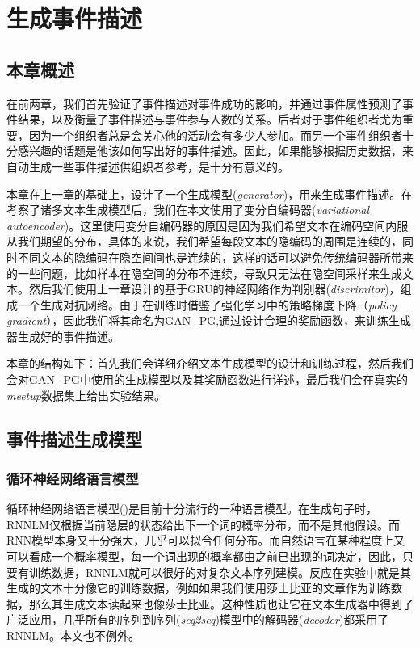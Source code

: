 \documentclass[]{template}
\begin{document}
\section{生成事件描述}

\subsection{本章概述}
在前两章，我们首先验证了事件描述对事件成功的影响，并通过事件属性预测了事件结果，以及衡量了事件描述与事件参与人数的关系。后者对于事件组织者尤为重要，因为一个组织者总是会关心他的活动会有多少人参加。而另一个事件组织者十分感兴趣的话题是他该如何写出好的事件描述。因此，如果能够根据历史数据，来自动生成一些事件描述供组织者参考，是十分有意义的。

本章在上一章的基础上，设计了一个生成模型(\textit{generator})，用来生成事件描述。在考察了诸多文本生成模型后，我们在本文使用了变分自编码器\cite{kingma_auto-encoding_2013,bowman_generating_2015}(\textit{variational autoencoder})。这里使用变分自编码器的原因是因为我们希望文本在编码空间内服从我们期望的分布，具体的来说，我们希望每段文本的隐编码的周围是连续的，同时不同文本的隐编码在隐空间间也是连续的，这样的话可以避免传统编码器所带来的一些问题，比如样本在隐空间的分布不连续，导致只无法在隐空间采样来生成文本。然后我们使用上一章设计的基于GRU的神经网络作为判别器(\textit{discrimitor})，组成一个生成对抗网络\cite{goodfellow_generative_2014}。由于在训练时借鉴了强化学习中的策略梯度下降（\textit{policy gradient}），因此我们将其命名为GAN\_PG,通过设计合理的奖励函数，来训练生成器生成好的事件描述。

本章的结构如下：首先我们会详细介绍文本生成模型的设计和训练过程，然后我们会对GAN\_PG中使用的生成模型以及其奖励函数进行详述，最后我们会在真实的\textit{meetup}数据集上给出实验结果。

\subsection{事件描述生成模型}
\subsubsection{循环神经网络语言模型}
循环神经网络语言模型(\cite{RNNLM})是目前十分流行的一种语言模型。在生成句子时，RNNLM仅根据当前隐层的状态给出下一个词的概率分布，而不是其他假设。而RNN模型本身又十分强大，几乎可以拟合任何分布。而自然语言在某种程度上又可以看成一个概率模型，每一个词出现的概率都由之前已出现的词决定，因此，只要有训练数据，RNNLM就可以很好的对复杂文本序列建模。反应在实验中就是其生成的文本十分像它的训练数据，例如如果我们使用莎士比亚的文章作为训练数据，那么其生成文本读起来也像莎士比亚。这种性质也让它在文本生成器中得到了广泛应用，几乎所有的序列到序列(\textit{seq2seq})模型中的解码器(\textit{decoder})都采用了RNNLM。本文也不例外。
\end{document}
